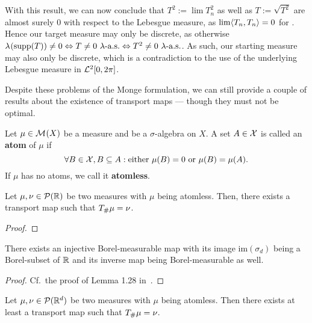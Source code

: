 With this result, we can now conclude that $T^2 := \lim T_n^2$ as well as $T := \sqrt{T^2}$ are almost surely $0$ with respect to the Lebesgue measure, as $\lim \langle T_n, T_n \rangle = 0$ for \Ninf. Hence our target measure may only be discrete, as otherwise $\lambda^{}(\text{supp}(T)) \neq 0 \Leftrightarrow T \neq 0~\lambda\text{-a.s.} \Leftrightarrow T^2 \neq 0~\lambda\text{-a.s.}$. As such, our starting measure may also only be discrete, which is a contradiction to the use of the underlying Lebesgue measure in $\mathcal{L}^{2}[0, 2\pi]$.

Despite these problems of the Monge formulation, we can still provide a couple of results about the existence of transport maps --- though they must not be optimal.

\begin{definition}\label{Atoms}
	Let $\mu \in \mathcal{M}_{}(X)$ be a measure and \X{} be a $\sigma$-algebra on $X$. A set $A \in \mathcal{X}$ is called an \textbf{atom} of $\mu$ if
	\[ \forall B \in \mathcal{X}, B \subseteq A : \text{either } \mu(B) = 0 \text{ or } \mu(B) = \mu(A). \]
	If $\mu$ has no atoms, we call it \textbf{atomless}.
\end{definition}

\begin{lemma}\label{1DTransMapExist}
	Let $\mu, \nu \in \mathcal{P}(\mathbb{R})$ be two measures with $\mu$ being atomless. Then, there exists a transport map \map[T]{\R}{\R} such that ${T}_{\#} \mu = \nu$.
\end{lemma}

\begin{proof}
\end{proof}

\begin{lemma}\label{BorelExist}
	There exists an injective Borel-measurable map  with its image $\text{im}(\sigma_d)$ being a Borel-subset of $\mathbb{R}$ and its inverse map being Borel-measurable as well.
\end{lemma}

\begin{proof}
	Cf.~the proof of Lemma 1.28 in~\cite{San2015}.
\end{proof}

\begin{corollary}\label{NDTransMapExist}
	Let $\mu, \nu \in \mathcal{P}(\mathbb{R}^d)$ be two measures with $\mu$ being atomless. Then there exists at least a transport map  such that ${T}_{\#} \mu = \nu$.
\end{corollary}

